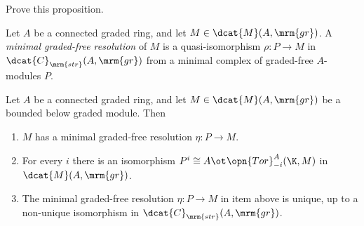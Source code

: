 \begin{exer} \label{exer:4530}
Prove this proposition. 
\end{exer}

\begin{dfn} \label{dfn:4235}
Let $A$ be a connected graded ring, and let $M \in \dcat{M}(A, \mrm{gr})$. 
A {\em minimal graded-free resolution}%
of $M$ is a quasi-isomorphism 
$\rho : P \to M$ in $\dcat{C}_{\mrm{str}}(A, \mrm{gr})$ from a minimal
complex of graded-free $A$-modules $P$.
\end{dfn}

\begin{prop} \label{prop:4265}   
Let $A$ be a connected graded ring, and let 
$M \in \dcat{M}(A, \mrm{gr})$ be a 
bounded below graded module. Then\tup{:}
\begin{enumerate}
\item $M$ has a minimal graded-free resolution $\eta : P \to M$.

\item For every $i$ there is an isomorphism 
$P^i \cong A \ot_{} \opn{Tor}^A_{-i}(\K, M)$
in $\dcat{M}(A, \mrm{gr})$.

\item The minimal graded-free resolution $\eta : P \to M$ in item  
above is unique, up to a non-unique isomorphism in 
$\dcat{C}_{\mrm{str}}(A,\mrm{gr})$.
\end{enumerate} 
\end{prop}

